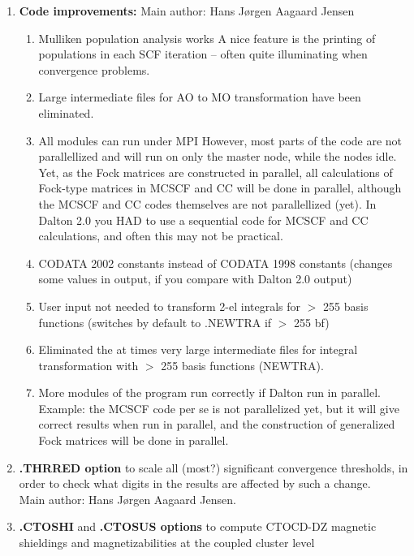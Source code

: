 \begin{enumerate}
\item{\bf Code improvements:}
Main author: Hans J\o rgen Aagaard Jensen
\begin{enumerate}
  \item{Mulliken population analysis works} A nice feature is the printing of populations in each
   SCF iteration -- often quite illuminating when convergence problems.
  \item{Large intermediate files for AO to MO transformation have been eliminated.}
  \item{All modules can run under MPI} However, most parts of the code are not parallellized and will run
    on only the master node, while the nodes idle. Yet, as the Fock matrices are constructed in parallel,
    all calculations of Fock-type matrices in MCSCF and CC will be done in parallel, although the MCSCF and CC
    codes themselves are not parallellized (yet). In Dalton 2.0 you HAD to use a sequential code for MCSCF and CC
    calculations, and often this may not be practical.
  \item{} CODATA 2002 constants instead of CODATA 1998 constants
    (changes some values in output, if you compare with Dalton 2.0 output)
  \item{} User input not needed to transform 2-el integrals for $>$ 255 basis functions
    (switches by default to .NEWTRA if $>$ 255 bf)
  \item{} Eliminated the at times very large intermediate files for integral transformation
    with $>$ 255 basis functions (NEWTRA).
  \item{} More modules of the program run correctly if Dalton run in parallel.
    Example: the MCSCF code per se is not parallelized yet, but it will
    give correct results when run in parallel, and the construction of
    generalized Fock matrices will be done in parallel.
\end{enumerate}

\item{\bf .THRRED option} to scale all (most?) significant
convergence thresholds, in order to check what digits in the results are
affected by such a change.\\
Main author: Hans J\o rgen Aagaard Jensen.

\item{\bf .CTOSHI} and {\bf .CTOSUS options} to compute CTOCD-DZ magnetic
shieldings and magnetizabilities at the coupled cluster level


\end{enumerate}

